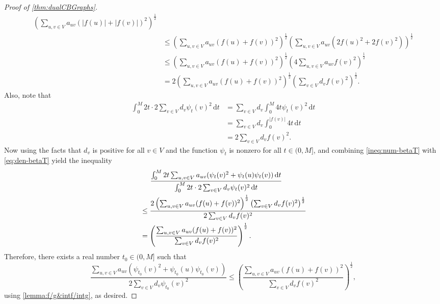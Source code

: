 \documentclass[12pt,a4paper,bold]{thesis}
\theoremstyle{definition}
\newcommand*{\abs}[1]{\left\vert #1 \right\vert}
\begin{document}
\begin{proof}[Proof of \cref{thm:dualCBGraphs}]
\begin{align}
        \left(\sum_{u,v \in V} a_{uv} (\abs{f(u)} + \abs{f(v)})^2\right)^\frac{1}{2} \nonumber
        \\
        & \leq
        \left(\sum_{u,v \in V} a_{uv} (f(u) + f(v))^2\right)^\frac{1}{2}
        \left(\sum_{u,v \in V} a_{uv} (2f(u)^2 + 2f(v)^2)\right)^\frac{1}{2} \nonumber
        \\
        & \leq
        \left(\sum_{u,v \in V} a_{uv} (f(u) + f(v))^2\right)^\frac{1}{2}
        \left(4 \sum_{u,v \in V} a_{uv} f(v)^2\right)^\frac{1}{2} \nonumber
        \\
        & =
        2 \left(\sum_{u,v \in V} a_{uv} (f(u) + f(v))^2\right)^\frac{1}{2}
        \left(\sum_{v \in V} d_v f(v)^2\right)^\frac{1}{2}. 
    \end{align}
    Also, note that
    \begin{align} \label{eq:den-betaT}
        \int_{0}^{M} 2t \cdot 2 \sum_{v \in V} d_v \psi_t(v)^2\, \mathrm{d}t
        & =
        \sum_{v \in V} d_v \int_{0}^{M} 4t \psi_t(v)^2\, \mathrm{d}t \nonumber
        \\
        & =
        \sum_{v \in V} d_v \int_{0}^{\abs{f(v)}} 4t\, \mathrm{d}t \nonumber
        \\
        & =
        2 \sum_{v \in V} d_v f(v)^2.
    \end{align}
    Now using the facts that $d_v$ is positive for all $v \in V$ and the function $\psi_t$
    is nonzero for all $t \in (0,M]$, and combining \eqref{ineq:num-betaT} with
    \eqref{eq:den-betaT} yield the inequality
    \begin{align*}
        & \hspace{0.49cm}
        \frac{\int_{0}^{M} 2t \sum_{u,v \in V} a_{uv} (\psi_t(v)^2 + \psi_t(u)\psi_t(v))\, 
        \mathrm{d}t}{\int_{0}^{M} 2t \cdot 2 \sum_{v \in V} d_v \psi_t(v)^2\, \mathrm{d}t}
        \\
        & \leq 
        \frac{2 \left(\sum_{u,v \in V} a_{uv} (f(u) + f(v))^2\right)^\frac{1}{2}
        \left(\sum_{v \in V} d_v f(v)^2\right)^\frac{1}{2}}{2 \sum_{v \in V} d_v f(v)^2}
        \\
        & =
        \left(\frac{\sum_{u,v \in V} a_{uv} (f(u) + f(v))^2}
        {\sum_{v \in V} d_v f(v)^2}\right)^\frac{1}{2}.
    \end{align*}
    Therefore, there exists a real number $t_0 \in (0, M]$ such that 
    \begin{equation*}
        \frac{\sum_{u,v \in V} a_{uv} (\psi_{t_0}(v)^2 + \psi_{t_0}(u)\psi_{t_0}(v))}
        {2 \sum_{v \in V} d_v \psi_{t_0}(v)^2} 
        \leq \left(\frac{\sum_{u,v \in V} a_{uv} (f(u) + f(v))^2}
        {\sum_{v \in V} d_v f(v)^2}\right)^\frac{1}{2},
    \end{equation*}
    using \cref{lemma:f/g&intf/intg}, as desired.
\end{proof}
\end{document}
